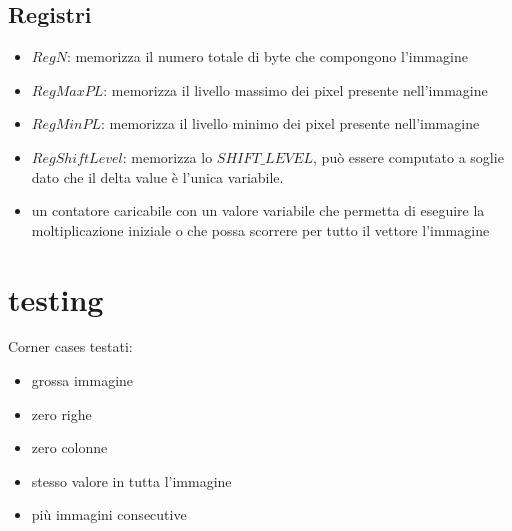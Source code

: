 \documentclass[11pt]{article} %
\begin{document}
\subsection{Registri}
\begin{itemize}
\item $RegN$: memorizza il numero totale di byte che compongono l'immagine
\item $RegMaxPL$: memorizza il livello massimo dei pixel presente nell'immagine
\item $RegMinPL$: memorizza il livello minimo dei pixel presente nell'immagine	
\item $RegShiftLevel$: memorizza lo $SHIFT\_LEVEL$, può essere computato a soglie dato che il delta value è l'unica variabile.
\item un contatore caricabile con un valore variabile che permetta di eseguire la moltiplicazione iniziale o che possa scorrere per tutto il vettore l'immagine
\end{itemize}

\section{testing}
Corner cases testati:
\begin{itemize}
\item grossa immagine
\item zero righe
\item zero colonne
\item stesso valore in tutta l'immagine
\item più immagini consecutive
\end{itemize}
\end{document}
